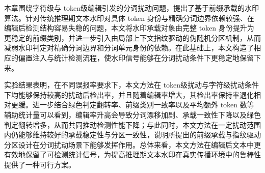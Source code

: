 本章围绕字符级与 token级编辑引发的分词扰动问题，提出了基于前缀承载的水印算法。针对传统推理期文本水印对具体 token 身份与精确分词边界依赖较强、在编辑后检测结构容易失稳的问题，本文将水印承载对象由完整 token 身份提升为更稳定的前缀类别，并进一步引入由局部上下文指纹驱动的伪随机分区机制，从而减弱水印判定对精确分词边界和分词单元身份的依赖。在此基础上，本文构造了相应的偏置注入与统计检测流程，使水印信号能够在分词扰动条件下更稳定地保留下来。

实验结果表明，在不同误报率要求下，本文方法在 token级扰动与字符级扰动条件下均能够保持较高的扰动后检出率，并且随着编辑率增大，其检出率保持率退化相对更缓。进一步结合绿色判定翻转率、前缀类别一致率以及平均额外 token 数等辅助统计量可以看到，编辑率升高会导致分词漂移加剧、承载一致性下降以及绿色判定翻转增多，从而共同推动检测性能下降；与此同时，本文方法在一定扰动范围内仍能够维持较好的承载稳定性与分区一致性，说明所提出的前缀承载与指纹驱动分区设计在分词扰动场景下能够发挥作用。总体来看，本文方法在编辑后文本中更有效地保留了可检测统计信号，为提高推理期文本水印在真实传播环境中的鲁棒性提供了一种可行方案。






